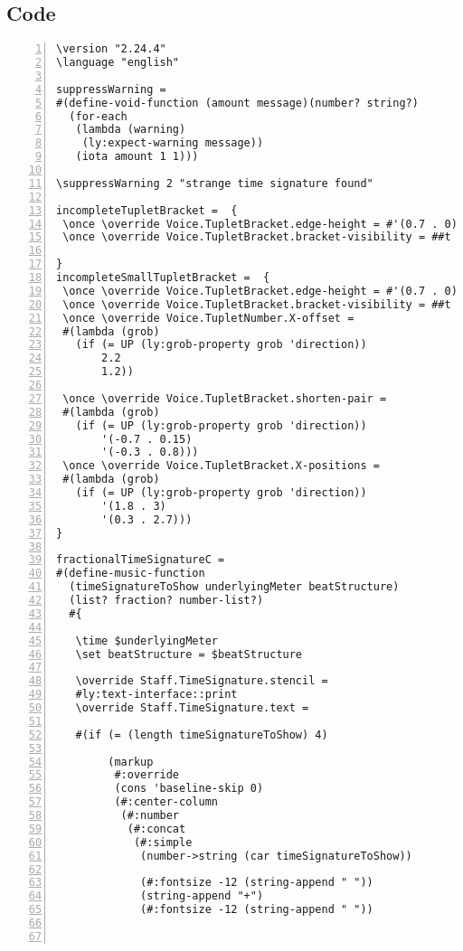 \subsection{Code}
\begin{Verbatim}[numbers=left,xleftmargin=5mm]
\version "2.24.4"
\language "english"

suppressWarning =
#(define-void-function (amount message)(number? string?)
  (for-each
   (lambda (warning)
    (ly:expect-warning message))
   (iota amount 1 1)))

\suppressWarning 2 "strange time signature found"

incompleteTupletBracket =  {
 \once \override Voice.TupletBracket.edge-height = #'(0.7 . 0)
 \once \override Voice.TupletBracket.bracket-visibility = ##t

}
incompleteSmallTupletBracket =  {
 \once \override Voice.TupletBracket.edge-height = #'(0.7 . 0)
 \once \override Voice.TupletBracket.bracket-visibility = ##t
 \once \override Voice.TupletNumber.X-offset =
 #(lambda (grob)
   (if (= UP (ly:grob-property grob 'direction))
       2.2
       1.2))

 \once \override Voice.TupletBracket.shorten-pair =
 #(lambda (grob)
   (if (= UP (ly:grob-property grob 'direction))
       '(-0.7 . 0.15)
       '(-0.3 . 0.8)))
 \once \override Voice.TupletBracket.X-positions =
 #(lambda (grob)
   (if (= UP (ly:grob-property grob 'direction))
       '(1.8 . 3)
       '(0.3 . 2.7)))
}

fractionalTimeSignatureC =
#(define-music-function
  (timeSignatureToShow underlyingMeter beatStructure)
  (list? fraction? number-list?)
  #{

   \time $underlyingMeter
   \set beatStructure = $beatStructure

   \override Staff.TimeSignature.stencil =
   #ly:text-interface::print
   \override Staff.TimeSignature.text =

   #(if (= (length timeSignatureToShow) 4)

        (markup
         #:override
         (cons 'baseline-skip 0)
         (#:center-column
          (#:number
           (#:concat
            (#:simple
             (number->string (car timeSignatureToShow))

             (#:fontsize -12 (string-append " "))
             (string-append "+")
             (#:fontsize -12 (string-append " "))



\end{Verbatim}
